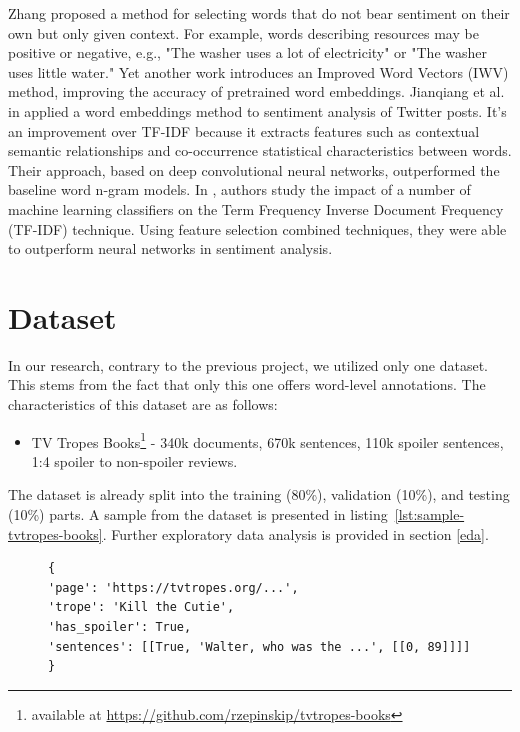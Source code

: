 \documentclass[11pt]{article}
\begin{document}
Zhang  proposed a method for selecting words that do not bear sentiment on their own but only given context. For example, words describing resources may be positive or negative, e.g., "The washer uses a lot of electricity" or "The washer uses little water." Yet another work \cite{rezaeinia2017improving} introduces an Improved Word Vectors (IWV) method, improving the accuracy of pretrained word embeddings. Jianqiang et al. in  applied a word embeddings method to sentiment analysis of Twitter posts. It's an improvement over TF-IDF because it extracts features such as contextual semantic relationships and co-occurrence statistical characteristics between words. Their approach, based on deep convolutional neural networks, outperformed the baseline word n-gram models. In \cite{madasu2020efficient}, authors study the impact of a number of machine learning classifiers on the Term Frequency Inverse Document Frequency (TF-IDF) technique. Using feature selection combined techniques, they were able to outperform neural networks in sentiment analysis.




\section{Dataset} \label{datasets}
In our research, contrary to the previous project, we utilized only one dataset. This stems from the fact that only this one offers word-level annotations. The characteristics of this dataset are as follows:
\begin{itemize}
\item TV Tropes Books\footnote{available at \url{https://github.com/rzepinskip/tvtropes-books}} - 340k documents, 670k sentences, 110k spoiler sentences, 1:4 spoiler to non-spoiler reviews.
\end{itemize}

The dataset is already split into the training (80\%), validation (10\%), and testing (10\%) parts. A sample from the dataset is presented in listing~\ref{lst:sample-tvtropes-books}.
Further exploratory data analysis is provided in section \ref{eda}.

\begin{figure}[h]
\begin{lstlisting}[basicstyle=\small,caption={Sample JSON object in the TV Tropes Books dataset. Each sentence contains a boolean flag that identifies spoiler sentences. In addition, annotated character indices provide specific spoiler boundaries - in the case depicted, the spoiler spans indexes from 0 to 89.},label={lst:sample-tvtropes-books}]
{
'page': 'https://tvtropes.org/...',
'trope': 'Kill the Cutie',
'has_spoiler': True,
'sentences': [[True, 'Walter, who was the ...', [[0, 89]]]]
}
\end{lstlisting}
\end{figure}
\end{document}
